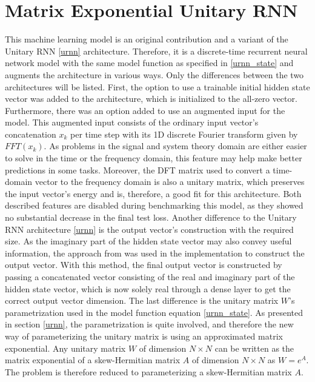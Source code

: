 \documentclass[draft,final]{vutinfth} %
\begin{document}
    \section{Matrix Exponential Unitary RNN} \label{meurnn}
    This machine learning model is an original contribution and a variant of the Unitary RNN \ref{urnn} architecture.
    Therefore, it is a discrete-time recurrent neural network model with the same model function as specified in \ref{urnn_state} and augments the architecture in various ways.
    Only the differences between the two architectures will be listed.
    First, the option to use a trainable initial hidden state vector was added to the architecture, which is initialized to the all-zero vector.
    Furthermore, there was an option added to use an augmented input for the model.
    This augmented input consists of the ordinary input vector's concatenation $x_k$ per time step with its 1D discrete Fourier transform given by $FFT(x_k)$.
    As problems in the signal and system theory domain are either easier to solve in the time or the frequency domain, this feature may help make better predictions in some tasks.
    Moreover, the DFT matrix used to convert a time-domain vector to the frequency domain is also a unitary matrix, which preserves the input vector's energy and is, therefore, a good fit for this architecture.
    Both described features are disabled during benchmarking this model, as they showed no substantial decrease in the final test loss.
    Another difference to the Unitary RNN architecture \ref{urnn} is the output vector's construction with the required size.
    As the imaginary part of the hidden state vector may also convey useful information, the approach from \cite[p. 4]{UnitaryRNNs} was used in the implementation to construct the output vector.
    With this method, the final output vector is constructed by passing a concatenated vector consisting of the real and imaginary part of the hidden state vector, which is now solely real through a dense layer to get the correct output vector dimension.
    The last difference is the unitary matrix $W$'s parametrization used in the model function equation \ref{urnn_state}.
    As presented in section \ref{urnn}, the parametrization is quite involved, and therefore the new way of parameterizing the unitary matrix is using an approximated matrix exponential.
    Any unitary matrix $W$ of dimension $N \times N$ can be written as the matrix exponential of a skew-Hermitian matrix $A$ of dimension $N \times N$ as $W=e^A$. The problem is therefore reduced to parameterizing a skew-Hermitian matrix $A$.
\end{document}
